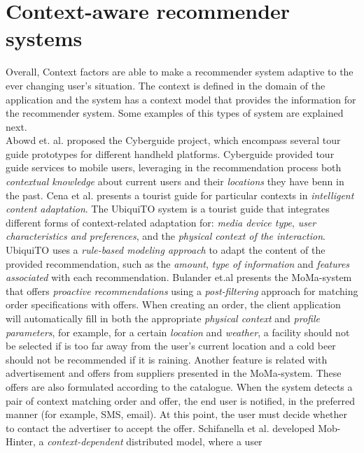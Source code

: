 \section{Context-aware recommender systems} 
Overall, Context factors are able to make a recommender system 
adaptive to the ever changing user's situation. The
context is defined in the domain of the application and the system has
a context model that provides the information for the recommender
system. Some  examples of this types of system are explained
next. \\
Abowd et. al.\cite{abowd1997cyberguide} proposed the
Cyberguide project, which encompass several tour 
guide prototypes for different handheld platforms. 
Cyberguide provided tour guide services to mobile users,
leveraging in the recommendation process both 
\textit{contextual knowledge} about current users and their 
\textit{locations} they have benn in the past. 
Cena et al.\cite{cena2006integrating} presents a tourist guide for particular 
contexts in \textit{intelligent content adaptation}. The UbiquiTO system is a
tourist guide that integrates different forms of context-related
adaptation for: \textit{media device type}, \textit{user characteristics and
preferences}, and the \textit{physical context of the interaction}. UbiquiTO uses
a \textit{rule-based modeling approach} to adapt the content of the provided
recommendation, such as the \textit{amount}, \textit{type of information} and 
\textit{features associated} with each recommendation. 
Bulander et.al\cite{bulander2005comparison} presents the MoMa-system 
that offers \textit{proactive recommendations} using a \textit{post-filtering} 
approach for matching order specifications with offers. 
When creating an order, the client application will automatically fill in both the 
appropriate \textit{physical context} and \textit{profile parameters}, for example, 
for a certain \textit{location} and \textit{weather}, a facility should not be selected
if is too far away from the user's current location and a cold beer should not be
recommended if it is raining. Another feature is related with 
advertisement and offers from suppliers presented in the MoMa-system. These offers are also
formulated according to the catalogue. When the system detects a pair
of context matching order and offer, the end user is notified, in the
preferred manner (for example, SMS, email). At this point, the user
must decide whether to contact the advertiser to accept the offer.
Schifanella et al.\cite{schifanella2008mobhinter} developed
Mob-Hinter, a \textit{context-dependent} distributed model, where a user 
